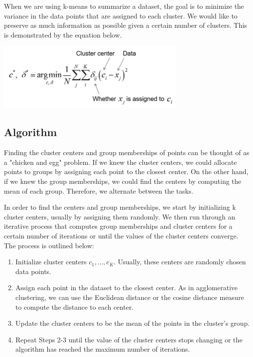\documentclass{article}
\begin{document}
When we are using k-means to summarize a dataset, the goal is to minimize the variance in the data points that are assigned to each cluster. We would like to preserve as much information as possible given a certain number of clusters. This is demonstrated by the equation below.
\begin{minipage}{\linewidth}
\begin{center}
\includegraphics[width=0.70\textwidth]{clustering_for_summarization.png}
\end{center}
\end{minipage}

\subsection{Algorithm}
Finding the cluster centers and group memberships of points can be thought of as a "chicken and egg" problem. If we knew the cluster centers, we could allocate points to groups by assigning each point to the closest center. On the other hand, if we knew the group memberships, we could find the centers by computing the mean of each group. Therefore, we alternate between the tasks.

In order to find the centers and group memberships, we start by initializing k cluster centers, usually by assigning them randomly. We then run through an iterative process that computes group memberships and cluster centers for a certain number of iterations or until the values of the cluster centers converge. The process is outlined below:

\begin{enumerate}
    \item Initialize cluster centers $c_1, ... , c_K$. Usually, these centers are randomly chosen data points.
    \item Assign each point in the dataset to the closest center. As in agglomerative clustering, we can use the Euclidean distance or the cosine distance measure to compute the distance to each center.
    \item Update the cluster centers to be the mean of the points in the cluster's group.
    \item Repeat Steps 2-3 until the value of the cluster centers stops changing or the algorithm has reached the maximum number of iterations.
\end{enumerate}
\end{document}
